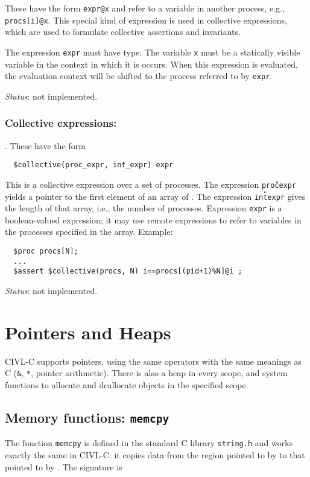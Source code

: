 These have the form \verb!expr@x! and refer to a variable in another
process, e.g., \verb!procs[i]@x!. This special kind of expression is
used in collective expressions, which are used to formulate collective
assertions and invariants.

The expression \verb!expr! must have \cproc{} type.  The variable
\texttt{x} must be a statically visible variable in the context in
which it is occurs.  When this expression is evaluated, the evaluation
context will be shifted to the process referred to by \texttt{expr}.

\emph{Status}: not implemented.

\subsection{Collective expressions: \ccollective}.  These have the form
\begin{verbatim}
  $collective(proc_expr, int_expr) expr 
\end{verbatim}
This is a collective expression over a set of processes.  The
expression \texttt{proc{\U}expr} yields a pointer to the first element
of an array of \cproc.  The expression \texttt{int{\U}expr} gives the
length of that array, i.e., the number of processes.  Expression
\texttt{expr} is a boolean-valued expression; it may use remote
expressions to refer to variables in the processes specified in the
array.  Example:
\begin{verbatim}
  $proc procs[N];
  ...
  $assert $collective(procs, N) i==procs[(pid+1)%N]@i ;
\end{verbatim}

\emph{Status}: not implemented.

\chapter{Pointers and Heaps}
\label{chap:pointers}

CIVL-C supports pointers, using the same operators with the same
meanings as C (\texttt{\&}, \texttt{*}, pointer arithmetic).  There is
also a heap in every scope, and system functions to allocate and
deallocate objects in the specified scope.

\section{Memory functions: \texttt{memcpy}}

The function \texttt{memcpy} is defined in the standard C library
\texttt{string.h} and works exactly the same in CIVL-C: it copies
data from the region pointed to by  to that pointed to by
.  The signature is

